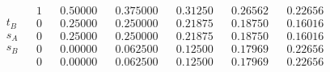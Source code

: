 \begin{exercises}
\begin{answer}
\begin{exparts}
\begin{equation*}
\begin{array}{cc|ccccc}
\begin{array}{c}
              t_B \\
              s_A \\
              s_B
            \end{array}
            &\begin{array}{c}
               1 \\
               0 \\
               0 \\
               0 \\
               0
            \end{array}
            &\begin{array}{c}
              0.50000 \\
              0.25000 \\
              0.25000 \\
              0.00000 \\
              0.00000
            \end{array}
            &\begin{array}{c}
              0.375000 \\
              0.250000 \\
              0.250000 \\
              0.062500 \\
              0.062500
            \end{array}
            &\begin{array}{c}
              0.31250 \\
              0.21875 \\
              0.21875 \\
              0.12500 \\
              0.12500
            \end{array}
            &\begin{array}{c}
              0.26562 \\
              0.18750 \\
              0.18750 \\
              0.17969 \\
              0.17969
            \end{array}
            &\begin{array}{c}
              0.22656 \\
              0.16016 \\
              0.16016 \\
              0.22656 \\
              0.22656

\end{array}
\end{array}
\end{equation*}
\end{exparts}
\end{answer}
\end{exercises}
